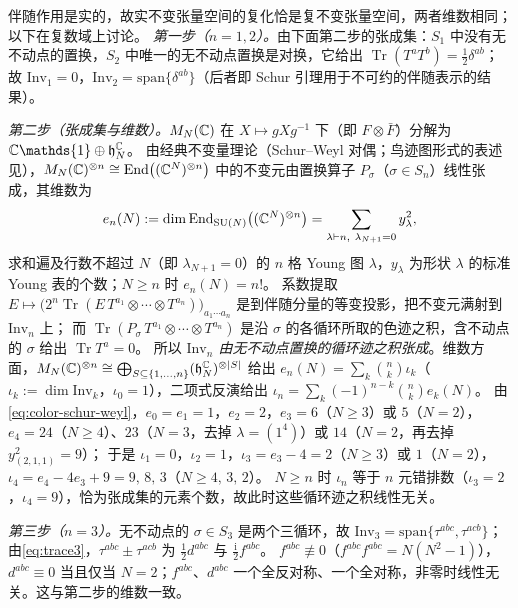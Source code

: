 \documentclass[UTF8,a4paper,11pt,fontset=fandol]{ctexart}
\makeatletter
\let\amsmathbb\mathbb
\renewcommand{\mathbb}[1]{\ifx1#1\mathds{1}\else\amsmathbb{#1}\fi}
\theoremstyle{cplain}
\theoremstyle{cdefinition}
\theoremstyle{cremark}
\renewcommand{\proofname}{证明}
\renewenvironment{proof}[1][\proofname]{\par\pushQED{\qed}\normalfont\topsep6\p@\@plus6\p@\relax
  \trivlist\item[\hskip\labelsep\itshape #1\hspace{0.5em}]\ignorespaces}{\popQED\endtrivlist\@endpefalse}
\numberwithin{equation}{section}
\DeclareMathOperator{\Tr}{Tr}
\newcommand{\ii}{\mathrm{i}}                        %
\makeatother
\begin{document}
\begin{proof}
伴随作用是实的，故实不变张量空间的复化恰是复不变张量空间，两者维数相同；以下在复数域上讨论。
\emph{第一步（$n=1,2$）。}由下面第二步的张成集：$S_1$ 中没有无不动点的置换，$S_2$ 中唯一的无不动点置换是对换，它给出 $\Tr(T^aT^b)=\frac12\delta^{ab}$；
故 $\mathrm{Inv}_1=0$，$\mathrm{Inv}_2=\mathrm{span}\{\delta^{ab}\}$（后者即 Schur 引理用于不可约的伴随表示的结果）。

\emph{第二步（张成集与维数）。}$M_N(\mathbb C)$ 在 $X\mapsto gXg^{-1}$ 下（即 $F\otimes\bar F$）分解为 $\mathbb C\mathbb 1\oplus\mathfrak h_N^{\mathbb C}$。
由经典不变量理论（Schur--Weyl 对偶；鸟迹图形式的表述见\cite{Cvitanovic2008}），$M_N(\mathbb C)^{\otimes n}\cong\mathrm{End}\bigl((\mathbb C^N)^{\otimes n}\bigr)$ 中的不变元由置换算子 $P_\sigma$（$\sigma\in S_n$）线性张成，其维数为
\begin{equation}\label{eq:color-schur-weyl}
e_n(N):=\dim\mathrm{End}_{\mathrm{SU}(N)}\bigl((\mathbb C^N)^{\otimes n}\bigr)=\sum_{\lambda\vdash n,\ \lambda_{N+1}=0}y_\lambda^2 ,
\end{equation}
求和遍及行数不超过 $N$（即 $\lambda_{N+1}=0$）的 $n$ 格 Young 图 $\lambda$，$y_\lambda$ 为形状 $\lambda$ 的标准 Young 表的个数；$N\ge n$ 时 $e_n(N)=n!$。
系数提取 $E\mapsto\bigl(2^n\Tr(E\,T^{a_1}\otimes\cdots\otimes T^{a_n})\bigr)_{a_1\cdots a_n}$ 是到伴随分量的等变投影，把不变元满射到 $\mathrm{Inv}_n$ 上；
而 $\Tr(P_\sigma\,T^{a_1}\otimes\cdots\otimes T^{a_n})$ 是沿 $\sigma$ 的各循环所取的色迹之积，含不动点的 $\sigma$ 给出 $\Tr T^a=0$。
所以 \emph{$\mathrm{Inv}_n$ 由无不动点置换的循环迹之积张成}。维数方面，$M_N(\mathbb C)^{\otimes n}\cong\bigoplus_{S\subseteq\{1,\dots,n\}}(\mathfrak h_N^{\mathbb C})^{\otimes|S|}$ 给出
$e_n(N)=\sum_{k}\binom nk \iota_k$（$\iota_k:=\dim\mathrm{Inv}_k$，$\iota_0=1$），二项式反演给出 $\iota_n=\sum_k(-1)^{n-k}\binom nk e_k(N)$。
由\cref{eq:color-schur-weyl}，$e_0=e_1=1$，$e_2=2$，$e_3=6$（$N\ge3$）或 $5$（$N=2$），$e_4=24$（$N\ge4$）、$23$（$N=3$，去掉 $\lambda=(1^4)$）或 $14$（$N=2$，再去掉 $y_{(2,1,1)}^2=9$）；
于是 $\iota_1=0$，$\iota_2=1$，$\iota_3=e_3-4=2$（$N\ge3$）或 $1$（$N=2$），$\iota_4=e_4-4e_3+9=9,\,8,\,3$（$N\ge4,\,3,\,2$）。
$N\ge n$ 时 $\iota_n$ 等于 $n$ 元错排数（$\iota_3=2$，$\iota_4=9$），恰为张成集的元素个数，故此时这些循环迹之积线性无关。

\emph{第三步（$n=3$）。}无不动点的 $\sigma\in S_3$ 是两个三循环，故 $\mathrm{Inv}_3=\mathrm{span}\{\tau^{abc},\tau^{acb}\}$；由\cref{eq:trace3}，$\tau^{abc}\pm\tau^{acb}$ 为 $\frac12d^{abc}$ 与 $\frac{\ii}2f^{abc}$。
$f^{abc}\not\equiv0$（$f^{abc}f^{abc}=N(N^2-1)$），$d^{abc}\equiv0$ 当且仅当 $N=2$；$f^{abc}$、$d^{abc}$ 一个全反对称、一个全对称，非零时线性无关。这与第二步的维数一致。


\end{proof}
\end{document}
